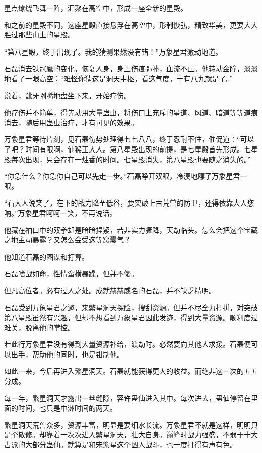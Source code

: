 
\begin{this_body}

星点缭绕飞舞一阵，汇聚在高空中，形成一座全新的星殿。

和之前的星殿不同，这座星殿直接悬浮在高空中，形制恢弘，精致华美，更要大大胜过那些山上的星殿。

“第八星殿，终于出现了。我的猜测果然没有错！”万象星君激动地道。

石磊消去铁冠鹰的变化，恢复人身，身上伤痕弥补，血流不止。他转动金瞳，淡淡地看了一眼高空：“难怪你猜这是洞天中枢，看这气度，十有八九就是了。”

说着，龇牙咧嘴地盘坐下来，开始疗伤。

他疗伤并不简单，得先动用大量蛊虫，将伤口上充斥的星道、风道、暗道等等道痕消去，随后用蛊虫治疗，才有可见的效果。

万象星君等待片刻，见石磊伤势处理得七七八八，终于忍耐不住，催促道：“可以了吧？时间有限啊，仙猴王大人。第八星殿出现的前提，是七星殿首先形成。七星殿每次出现，只会存在一炷香的时间。七星殿消失，第八星殿也要随之消失的。”

“你急什么？你急你自己可以先走一步。”石磊睁开双眼，冷漠地瞟了万象星君一眼。

“石大人说笑了，在下的战力降至低谷，要突破上古荒兽的防卫，还得依靠大人您呐。”万象星君呵呵一笑，不再说话。

他藏在袖口中的双拳却是暗暗捏紧，若非实力骤降，天劫临头。怎么会把这个宝藏之地主动暴露？又怎么会受这等窝囊气？

他知道石磊的图谋和打算。

石磊嗜战如命，性情蛮横暴躁，但并不傻。

但凡高位者。必有过人之处。成就赫赫威名的石磊，并不缺乏精明。

石磊受到万象星君之邀，来繁星洞天探险，搜刮资源。但并不尽全力打拼，对突破第八星殿虽然有兴趣，但却不想看到万象星君因此发迹，得到大量资源。顺利度过难关，脱离他的掌控。

若此行万象星君没有得到大量资源补给，渡劫时。必然要向其他人求援。石磊便可以出手，帮助他的同时，也是钳制他。

如此一来，今后再进入繁星洞天。石磊就能获得更大的收益。而绝非这一次的五五分成。

每一年，繁星洞天才露出一丝缝隙，容许蛊仙进入其中。每次进去，蛊仙停留在里面的时间，也只是中洲时间的两天。

繁星洞天荒兽众多，资源丰富，明显是要细水长流。万象星君不就是这样，明明只是个散修。却靠着一次次进入繁星洞天，壮大自身。巅峰时战力强盛，不弱于十大古派的大部分蛊仙。就算是和宋紫星这个凶人战斗，也一度打得有声有色。


\end{this_body}
